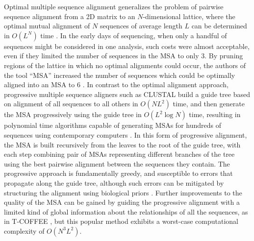 Optimal multiple sequence alignment generalizes the problem of pairwise sequence alignment from a 2D matrix to an $N$-dimensional lattice, where the optimal mutual alignment of $N$ sequences of average length $L$ can be determined in $O(L^{N})$ time \cite{carrillo1988multiple}.
In the early days of sequencing, when only a handful of sequences might be considered in one analysis, such costs were almost acceptable, even if they limited the number of sequences in the MSA to only 3.
By pruning regions of the lattice in which no optimal alignments could occur, the authors of the tool ``MSA'' increased the number of sequences which could be optimally aligned into an MSA to 6 \cite{lipman1989tool}.
In contrast to the optimal alignment approach, progressive multiple sequence aligners such as CLUSTAL build a guide tree based on alignment of all sequences to all others in $O(NL^{2})$ time, and then generate the MSA progressively using the guide tree in $O(L^{2}\log N)$ time, resulting in polynomial time algorithms capable of generating MSAs for hundreds of sequences using contemporary computers \cite{higgins1988clustal}.
In this form of progressive alignment, the MSA is built recursively from the leaves to the root of the guide tree, with each step combining pair of MSAs representing different branches of the tree using the best pairwise alignment between the sequences they contain.
The progressive approach is fundamentally greedy, and susceptible to errors that propagate along the guide tree, although such errors can be mitigated by structuring the alignment using biological priors \cite{thompson1994clustal}.
Further improvements to the quality of the MSA can be gained by guiding the progressive alignment with a limited kind of global information about the relationships of all the sequences, as in T-COFFEE \cite{notredame2000t}, but this popular method exhibits a worst-case computational complexity of $O(N^{3}L^{2})$.

